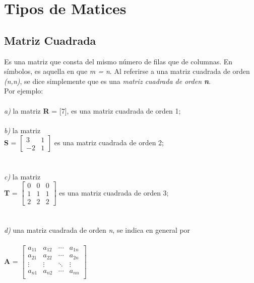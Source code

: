 \documentclass[a4paper,12pt]{report} %
\begin{document}
\chapter{Tipos de Matices}

\section{Matriz Cuadrada}
Es una matriz que consta del mismo número de filas que de columnas.
En símbolos, es aquella en que \textit{m = n}. Al referirse a una matriz cuadrada de orden \textit{(n,n)}, se dice simplemente que es una \textit{matriz cuadrada de orden \textbf{n}}.\\
Por ejemplo:
\\ \\
\textit{a)}  la matriz \textbf{R} = [7], es una matriz cuadrada de orden 1;\\ \\
\textit{b)}  la matriz\\ 

\textbf{S} =
$\begin{bmatrix}
3 & 1 \\
-2 & 1
\end{bmatrix}$
es una matriz cuadrada de orden 2;\\ \\
\\\textit{c)}  la matriz\\ 

\textbf{T} =
$\begin{bmatrix}
0 & 0 & 0 \\
1 & 1 & 1 \\
2 & 2 & 2
\end{bmatrix}$
es una matriz cuadrada de orden 3; \\ \\ 
\\\textit{d)}  una matriz cuadrada de orden \textit{n}, se indica en general por\\ \\
\textbf{A} =  
$\begin{bmatrix}
a_{11} & a_{12} & \cdots & a_{1n} \\
a_{21} & a_{22} & \cdots & a_{2n} \\
\vdots & \vdots & \ddots & \vdots \\
a_{n1} & a_{n2} & \cdots & a_{nn} \\
\end{bmatrix}$
\end{document}
